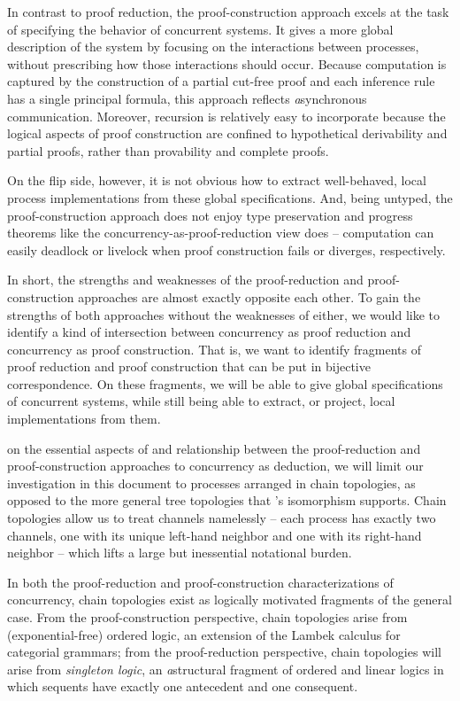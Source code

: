 In contrast to proof reduction, the proof-construction approach excels at the task of specifying the behavior of concurrent systems.
It gives a more global description of the system by focusing on the interactions between processes, without prescribing how those interactions should occur.
Because computation is captured by the construction of a partial cut-free proof and each inference rule has a single principal formula, this approach reflects \emph{a}syn\-chronous communication.
Moreover, recursion is relatively easy to incorporate because the logical aspects of proof construction are confined to hypothetical derivability and partial proofs, rather than provability and complete proofs.

On the flip side, however, it is not obvious how to extract well-behaved, local process implementations from these global specifications.
And, being untyped, the proof-construction approach does not enjoy type preservation and progress theorems like the concurrency-as-proof-reduction view does -- computation can easily deadlock or livelock when proof construction fails or diverges, respectively.

In short, the strengths and weaknesses of the proof-reduction and proof-construction approaches are almost exactly opposite each other.
To gain the strengths of both approaches without the weaknesses of either, we would like to identify a kind of intersection between concurrency as proof reduction and concurrency as proof construction.
That is, we want to identify fragments of proof reduction and proof construction that can be put in bijective correspondence.
On these fragments, we will be able to give global specifications of concurrent systems, while still being able to extract, or project, local implementations from them.

 on the essential aspects of and relationship between the proof-reduction and proof-construction approaches to concurrency as deduction, we will limit our investigation in this document to processes arranged in chain topologies, as opposed to the more general tree topologies that \citeauthor{Caires+:MSCS16}'s isomorphism supports.
Chain topologies allow us to treat channels namelessly -- each process has exactly two channels, one with its unique left-hand neighbor and one with its right-hand neighbor -- which lifts a large but inessential notational burden.

In both the proof-reduction and proof-construction characterizations of concurrency, chain topologies exist as logically motivated fragments of the general case.
From the proof-construction perspective, chain topologies arise from (exponential-free) ordered logic\autocites{Lambek:SLIM61}{Kanazawa:LLI92}{Polakow+Pfenning:MFPS99}, an extension of the Lambek calculus for categorial grammars\autocite{Lambek:AMM58};
from the proof-reduction perspective, chain topologies will arise from \emph{singleton logic}\autocites{Santocanale:FOSSACS02}{Fortier+Santocanale:CSL13}, an \emph{a}struc\-tural fragment of ordered and linear logics in which sequents have exactly one antecedent and one consequent.

